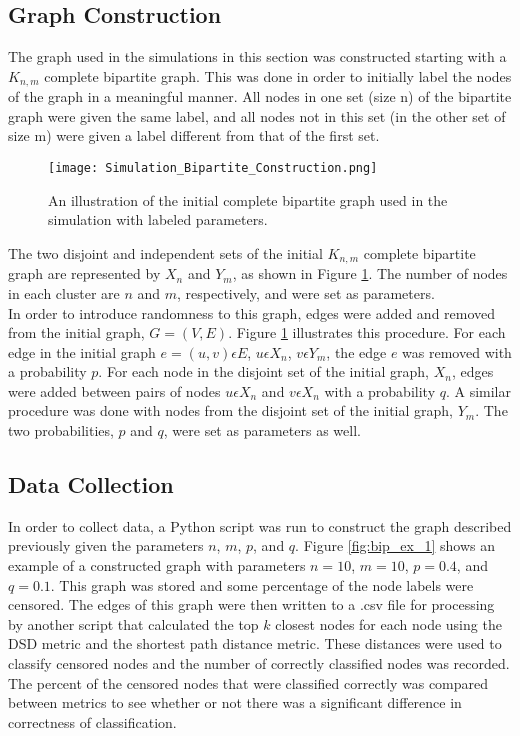 \subsection{Graph Construction}
The graph used in the simulations in this section was constructed starting with a $K_{n,m}$ complete bipartite graph. This was done in order to initially label the nodes of the graph in a meaningful manner. All nodes in one set (size n) of the bipartite graph were given the same label, and all nodes not in this set (in the other set of size m) were given a label different from that of the first set.\\

\begin{figure}[!ht]
\centering
\texttt{[image: Simulation\_Bipartite\_Construction.png]}
\caption{An illustration of the initial complete bipartite graph used in the simulation with labeled parameters.}
\label{fig:bip_construct}
\end{figure}

\noindent
The two disjoint and independent sets of the initial $K_{n,m}$ complete bipartite graph are represented by $X_{n}$ and $Y_{m}$, as shown in Figure \ref{fig:bip_construct}. The number of nodes in each cluster are $n$ and $m$, respectively, and were set as parameters.\\

\noindent
In order to introduce randomness to this graph, edges were added and removed from the initial graph, $G = (V,E)$. Figure \ref{fig:bip_construct} illustrates this procedure. For each edge in the initial graph $e=(u,v) \epsilon E$, $u \epsilon X_{n}$, $v \epsilon Y_{m}$, the edge $e$ was removed with a probability $p$. For each node in the disjoint set of the initial graph, $X_{n}$, edges were added between pairs of nodes $u \epsilon X_{n}$ and $v \epsilon X_{n}$ with a probability $q$. A similar procedure was done with nodes from the disjoint set of the initial graph, $Y_{m}$. The two probabilities, $p$ and $q$, were set as parameters as well.\\

\subsection{Data Collection}
\noindent
In order to collect data, a Python script was run to construct the graph described previously given the parameters $n$, $m$, $p$, and $q$. Figure \ref{fig:bip_ex_1} shows an example of a constructed graph with parameters $n=10$, $m=10$, $p=0.4$, and $q=0.1$. This graph was stored and some percentage of the node labels were censored. The edges of this graph were then written to a .csv file for processing by another script that calculated the top $k$ closest nodes for each node using the DSD metric and the shortest path distance metric. These distances were used to classify censored nodes and the number of correctly classified nodes was recorded. The percent of the censored nodes that were classified correctly was compared between metrics to see whether or not there was a significant difference in correctness of classification.\\

